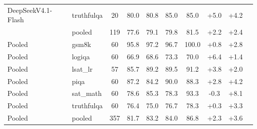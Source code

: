 {\begin{tabular}{l l c c c c c c c c}
DeepSeekV4.1-Flash & truthfulqa & 20 & 80.0 & 80.8 & 85.0 & 85.0 & +5.0 & +4.2 \\
 & pooled & 119 & 77.6 & 79.1 & 79.8 & 81.5 & +2.2 & +2.4 \\
\midrule
Pooled & gsm8k & 60 & 95.8 & 97.2 & 96.7 & 100.0 & +0.8 & +2.8 \\
Pooled & logiqa & 60 & 66.9 & 68.6 & 73.3 & 70.0 & +6.4 & +1.4 \\
Pooled & lsat\_lr & 57 & 85.7 & 89.2 & 89.5 & 91.2 & +3.8 & +2.0 \\
Pooled & piqa & 60 & 87.2 & 84.2 & 90.0 & 88.3 & +2.8 & +4.2 \\
Pooled & sat\_math & 60 & 78.6 & 85.3 & 78.3 & 93.3 & -0.3 & +8.1 \\
Pooled & truthfulqa & 60 & 76.4 & 75.0 & 76.7 & 78.3 & +0.3 & +3.3 \\
Pooled & pooled & 357 & 81.7 & 83.2 & 84.0 & 86.8 & +2.3 & +3.6 \\
\bottomrule
\end{tabular}}
